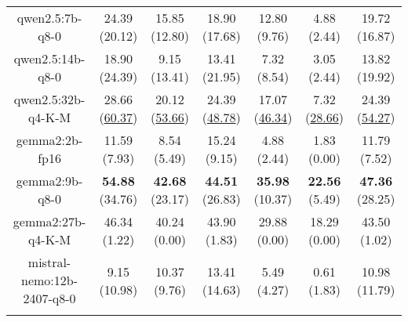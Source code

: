 \begin{table}[hbp]
{\begin{tabular}{ccccccc}
        \multicolumn{1}{c|}{qwen2.5:7b-q8-0} & 24.39 (20.12) & 15.85 (12.80) & \multicolumn{1}{c|}{18.90 (17.68)} & 12.80 (9.76) & \multicolumn{1}{c|}{4.88 (2.44)} & 19.72 (16.87) \\
        

        \multicolumn{1}{c|}{qwen2.5:14b-q8-0} & 18.90 (24.39) & 9.15 (13.41) & \multicolumn{1}{c|}{13.41 (21.95)} & 7.32 (8.54) & \multicolumn{1}{c|}{3.05 (2.44)} & 13.82 (19.92) \\
        

        \multicolumn{1}{c|}{qwen2.5:32b-q4-K-M} & 28.66 (\underline{60.37}) & 20.12 (\underline{53.66}) & \multicolumn{1}{c|}{24.39 (\underline{48.78})} & 17.07 (\underline{46.34}) & \multicolumn{1}{c|}{7.32 (\underline{28.66})} & 24.39 (\underline{54.27}) \\
        

        \multicolumn{1}{c|}{gemma2:2b-fp16} & 11.59 (7.93) & 8.54 (5.49) & \multicolumn{1}{c|}{15.24 (9.15)} & 4.88 (2.44) & \multicolumn{1}{c|}{1.83 (0.00)} & 11.79 (7.52) \\
        

        \multicolumn{1}{c|}{gemma2:9b-q8-0} & \textbf{54.88} (34.76) & \textbf{42.68} (23.17) & \multicolumn{1}{c|}{\textbf{44.51} (26.83)} & \textbf{35.98} (10.37) & \multicolumn{1}{c|}{\textbf{22.56} (5.49)} & \textbf{47.36} (28.25) \\
        

        \multicolumn{1}{c|}{gemma2:27b-q4-K-M} & 46.34 (1.22) & 40.24 (0.00) & \multicolumn{1}{c|}{43.90 (1.83)} & 29.88 (0.00) & \multicolumn{1}{c|}{18.29 (0.00)} & 43.50 (1.02) \\
        

        \multicolumn{1}{c|}{mistral-nemo:12b-2407-q8-0} & 9.15 (10.98) & 10.37 (9.76) & \multicolumn{1}{c|}{13.41 (14.63)} & 5.49 (4.27) & \multicolumn{1}{c|}{0.61 (1.83)} & 10.98 (11.79) \\
        
\\ \hline
\end{tabular}%
}
\end{table}
    